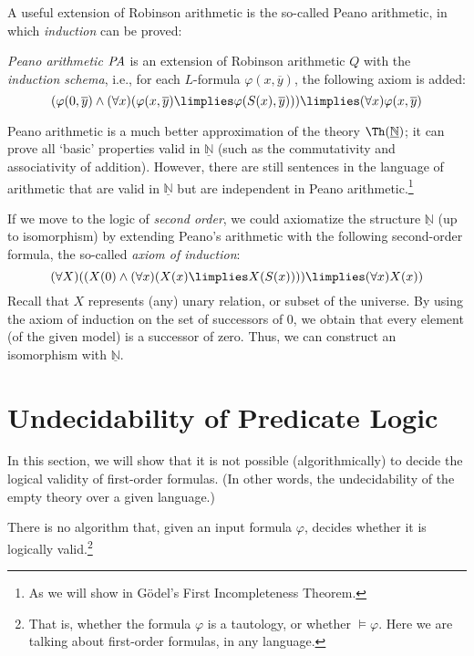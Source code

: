 A useful extension of Robinson arithmetic is the so-called Peano arithmetic, in which \emph{induction} can be proved:

\begin{definition}
\emph{Peano arithmetic} $\text{\it PA}$ is an extension of Robinson arithmetic $Q$ with the \emph{induction schema}, i.e., for each $L$-formula $\varphi(x, \overline{y})$, the following axiom is added:
$$
(\varphi(0, \overline{y}) \land (\forall x)(\varphi(x, \overline{y}) \limplies \varphi(S(x), \overline{y}))) \limplies (\forall x)\varphi(x, \overline{y})
$$
\end{definition}

Peano arithmetic is a much better approximation of the theory $\Th(\underline{\mathbb{N}})$; it can prove all `basic' properties valid in $\underline{\mathbb{N}}$ (such as the commutativity and associativity of addition). However, there are still sentences in the language of arithmetic that are valid in $\underline{\mathbb{N}}$ but are independent in Peano arithmetic.\footnote{As we will show in Gödel's First Incompleteness Theorem.} 


\begin{remark}
    If we move to the logic of \emph{second order}, we could axiomatize the structure $\underline{\mathbb N}$ (up to isomorphism) by extending Peano's arithmetic with the following second-order formula, the so-called \emph{axiom of induction}:
    $$
    (\forall X)((X(0) \land (\forall x)(X(x) \limplies X(S(x)))) \limplies (\forall x)X(x))
    $$
    Recall that $X$ represents (any) unary relation, or subset of the universe. By using the axiom of induction on the set of successors of 0, we obtain that every element (of the given model) is a successor of zero. Thus, we can construct an isomorphism with $\underline{\mathbb N}$.
    \end{remark}
    
    \section{Undecidability of Predicate Logic}
    
    In this section, we will show that it is not possible (algorithmically) to decide the logical validity of first-order formulas. (In other words, the undecidability of the empty theory over a given language.)
    
    \begin{theorem}\label{theorem:undecidability-of-predicate-logic}
    There is no algorithm that, given an input formula $\varphi$, decides whether it is logically valid.\footnote{That is, whether the formula $\varphi$ is a tautology, or whether $\models\varphi$. Here we are talking about first-order formulas, in any language.}
    \end{theorem}
    
